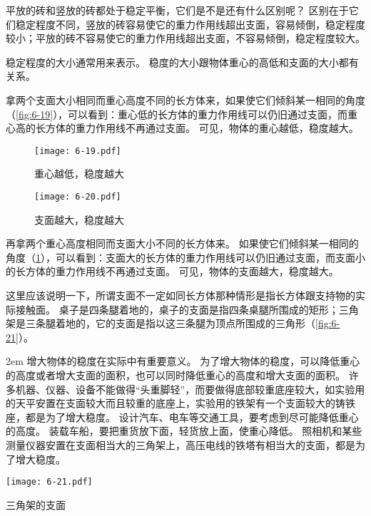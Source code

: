 平放的砖和竖放的砖都处于稳定平衡，它们是不是还有什么区别呢？
区别在于它们稳定程度不同，竖放的砖容易使它的重力作用线超出支面，容易倾倒，稳定程度较小；平放的砖不容易使它的重力作用线超出支面，不容易倾倒，稳定程度较大。

稳定程度的大小通常用来表示。
稳度的大小跟物体重心的高低和支面的大小都有关系。

拿两个支面大小相同而重心高度不同的长方体来，如果使它们倾斜某一相同的角度（\cref{fig:6-19}），可以看到：重心低的长方体的重力作用线可以仍旧通过支面，而重心高的长方体的重力作用线不再通过支面。
可见，物体的重心越低，稳度越大。
\begin{figure}
  \texttt{[image: 6-19.pdf]}
  \caption{重心越低，稳度越大}\label{fig:6-19}
  \texttt{[image: 6-20.pdf]}
  \caption{支面越大，稳度越大}\label{fig:6-20}
\end{figure}

再拿两个重心高度相同而支面大小不同的长方体来。
如果使它们倾斜某一相同的角度（\cref{fig:6-20}），可以看到：支面大的长方体的重力作用线可以仍旧通过支面，而支面小的长方体的重力作用线不再通过支面。
可见，物体的支面越大，稳度越大。

这里应该说明一下，所谓支面不一定如同长方体那种情形是指长方体跟支持物的实际接触面。
桌子是四条腿着地的，桌子的支面是指四条桌腿所围成的矩形；三角架是三条腿着地的，它的支面是指以这三条腿为顶点所围成的三角形（\cref{fig:6-21}）。

\medskip\noindent
\begin{minipage}{0.71\linewidth}\parindent2em
增大物体的稳度在实际中有重要意义。
为了增大物体的稳度，可以降低重心的高度或者增大支面的面积，也可以同时降低重心的高度和增大支面的面积。
许多机器、仪器、设备不能做得“头重脚轻”，而要做得底部较重底座较大，如实验用的天平安置在支面较大而且较重的底座上，实验用的铁架有一个支面较大的铸铁座，都是为了增大稳度。
设计汽车、电车等交通工具，要考虑到尽可能降低重心的高度。
装载车船，要把重货放下面，轻货放上面，使重心降低。
照相机和某些测量仪器安置在支面相当大的三角架上，高压电线的铁塔有相当大的支面，都是为了增大稳度。
\end{minipage}\hfill
\begin{minipage}{0.27\linewidth}\centering
  \begin{figurehere}
    \texttt{[image: 6-21.pdf]}
    \caption{三角架的支面}\label{fig:6-21}
  \end{figurehere}
\end{minipage}

